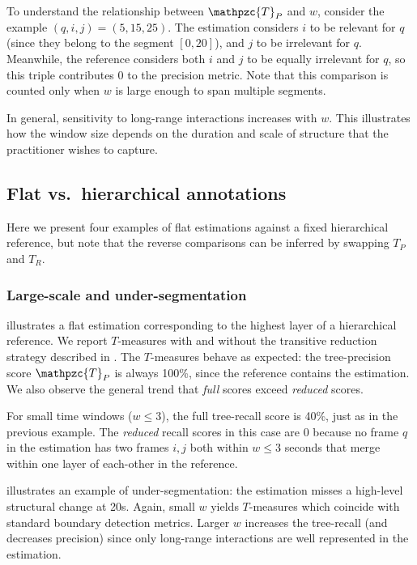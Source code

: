 \documentclass{article}
\def\shag{\ensuremath{\mathpzc{T}}}
\begin{document}
To understand the relationship between $\shag_P$ and $w$, consider the example 
$(q,i,j) = (5,15,25)$.
The estimation considers $i$ to be relevant for $q$ (since they belong to the segment $[0, 20]$), 
and $j$ to be irrelevant for $q$. Meanwhile, the reference considers both $i$
and $j$ to be equally irrelevant for $q$, so this triple contributes 0 to the precision
metric.
Note that this comparison is counted only when $w$ is large enough to span multiple
segments.

In general, sensitivity to long-range interactions increases with $w$.
This illustrates how the window size depends on the duration and scale of structure
that the practitioner wishes to capture.

\subsection{Flat vs.\ hierarchical annotations}

Here we present four examples of flat estimations against a fixed hierarchical reference, but note that the
reverse comparisons can be inferred by swapping $T_P$ and $T_R$.

\subsubsection{Large-scale and under-segmentation}
\label{sec:largeover}

 illustrates a flat estimation corresponding to the highest layer of 
a hierarchical reference.
We report $T$-measures with and without the transitive reduction strategy described in
.  The $T$-measures behave as expected: the tree-precision score
$\shag_P$ is always 100\%, since the reference contains the estimation.
We also observe the general trend that \emph{full} scores exceed 
\emph{reduced} scores.

For small time windows ($w \leq 3$), the full tree-recall score is 40\%, just as in the previous example.
The \emph{reduced} recall scores in this case are 0 because no frame $q$ in the
estimation has two frames $i, j$ both within $w \leq 3$ seconds that merge within one layer of each-other in the reference. 


 illustrates an example of under-segmentation: the estimation misses a high-level structural change at 20s.  
Again, small $w$ yields $T$-measures which coincide with standard boundary detection metrics.
Larger $w$ increases the tree-recall (and decreases precision)
since only long-range interactions are well represented in the estimation.
\end{document}
